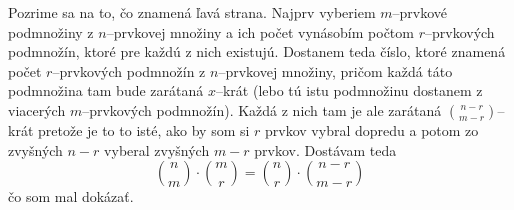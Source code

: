 
Pozrime sa na to, čo znamená ľavá strana. Najprv vyberiem $m$--prvkové 
podmnožiny z $n$--prvkovej množiny a ich počet vynásobím počtom 
$r$--prvkových podmnožín, ktoré pre každú z nich existujú. Dostanem 
teda číslo, ktoré znamená počet $r$--prvkových podmnožín z $n$--prvkovej 
množiny, pričom každá táto podmnožina tam bude zarátaná $x$--krát (lebo 
tú istu podmnožinu dostanem z viacerých $m$--prvkových podmnožín). Každá 
z nich tam je ale zarátaná $\binom{n-r}{m-r}$--krát pretože je to to 
isté, ako by som si $r$ prvkov vybral dopredu a potom zo zvyšných $n-r$ 
vyberal zvyšných $m-r$ prvkov. Dostávam teda 
\[\binom{n}{m} \cdot \binom{m}{r} = 
\binom{n}{r} \cdot \binom{n-r}{m-r} \] 
čo som mal dokázať.

